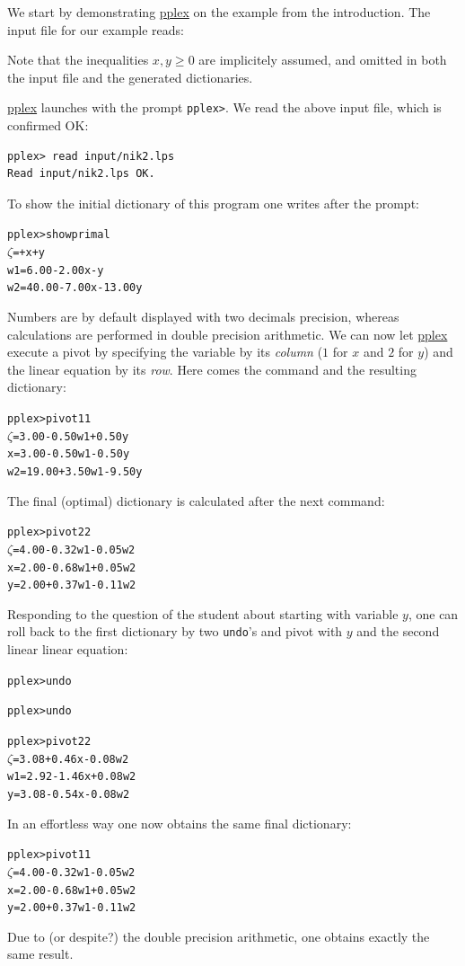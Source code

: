 \documentclass[ukenglish]{nik}
\begin{document}
We start by demonstrating \url{pplex} on the example from the introduction.
The input file for our example reads:
\begin{alltt}

\end{alltt}
Note that the inequalities $x,y \geq 0$ are implicitely assumed, and omitted in both the input file and the generated dictionaries.

\url{pplex} launches with the prompt \verb|pplex>|.
We read the above input file, which is confirmed OK:
\begin{verbatim}
pplex> read input/nik2.lps
Read input/nik2.lps OK.
\end{verbatim}
To show the initial dictionary of this program one writes after the prompt:
\begin{alltt}
pplex> show primal
 \(\zeta\) =       +     x +      y
w1 =  6.00 - 2.00x -      y
w2 = 40.00 - 7.00x - 13.00y
\end{alltt}
Numbers are by default displayed with two decimals precision, whereas
calculations are performed in double precision arithmetic.
We can now let \url{pplex} execute a pivot by specifying
the variable by its \emph{column} ($1$ for $x$ and $2$ for $y$)
and the linear equation by its \emph{row}. 
Here comes the command and the resulting dictionary:
\begin{alltt}
pplex> pivot 1 1
 \(\zeta\) =  3.00 - 0.50w1 + 0.50y
 x =  3.00 - 0.50w1 - 0.50y
w2 = 19.00 + 3.50w1 - 9.50y
\end{alltt}
The final (optimal) dictionary is calculated after the next command:
\begin{alltt}
pplex> pivot 2 2
 \(\zeta\) = 4.00 - 0.32w1 - 0.05w2
 x = 2.00 - 0.68w1 + 0.05w2
 y = 2.00 + 0.37w1 - 0.11w2
\end{alltt}
Responding to the question of the student about starting with variable $y$, 
one can roll back to the first dictionary by two \verb|undo|'s and pivot
with $y$ and the second linear linear equation:
\begin{alltt}
pplex> undo

pplex> undo

pplex> pivot 2 2
 \(\zeta\) = 3.08 + 0.46x - 0.08w2
w1 = 2.92 - 1.46x + 0.08w2
 y = 3.08 - 0.54x - 0.08w2
\end{alltt}
In an effortless way one now obtains the same final dictionary:
\begin{alltt}
pplex> pivot 1 1 
 \(\zeta\) = 4.00 - 0.32w1 - 0.05w2
 x = 2.00 - 0.68w1 + 0.05w2
 y = 2.00 + 0.37w1 - 0.11w2
\end{alltt}
Due to (or despite?) the double precision arithmetic, one obtains exactly the same result.
\end{document}
